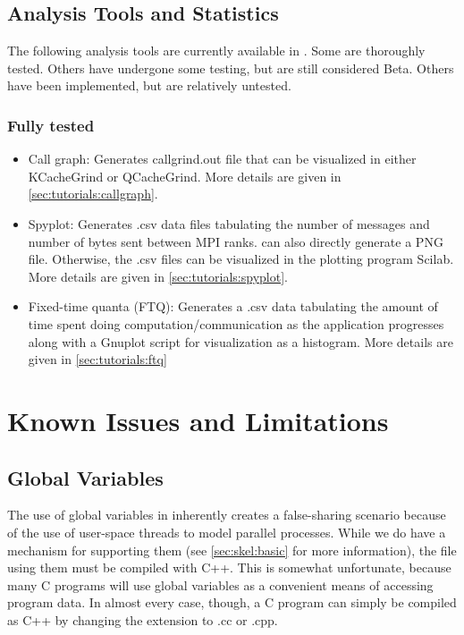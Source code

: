 \subsection{Analysis Tools and Statistics}
\label{subsec:intro:toolsandstats}
The following analysis tools are currently available in \sstmacro.
Some are thoroughly tested. Others have undergone some testing, but are still considered Beta.  Others have been implemented, but are relatively untested.
\subsubsection{Fully tested}
\label{subsubsec:intro:fulltestedtools}
\begin{itemize}
\item Call graph: Generates callgrind.out file that can be visualized in either KCacheGrind or QCacheGrind. More details are given in \ref{sec:tutorials:callgraph}.
\item Spyplot: Generates .csv data files tabulating the number of messages and number of bytes sent between MPI ranks. \sstmacro can also directly generate a PNG file. Otherwise, the .csv files can be visualized in the plotting program Scilab. More details are given in \ref{sec:tutorials:spyplot}.
\item Fixed-time quanta (FTQ): Generates a .csv data tabulating the amount of time spent doing computation/communication as the application progresses along with a Gnuplot script for visualization as a histogram. More details are given in \ref{sec:tutorials:ftq}
\end{itemize}

\section{Known Issues and Limitations}
\label{sec:intro:issues}

\subsection{Global Variables}
\label{subsec:issues:globals}

The use of global variables in \sstmacro inherently creates a false-sharing scenario 
because of the use of user-space threads to model parallel processes.   
While we do have a mechanism for supporting them (see \ref{sec:skel:basic} for more information), 
the file using them must be compiled with C++.   
This is somewhat unfortunate, because many C programs will use global variables as a convenient means of accessing program data.   
In almost every case, though, a C program can simply be compiled as C++ by changing the extension to .cc or .cpp.

